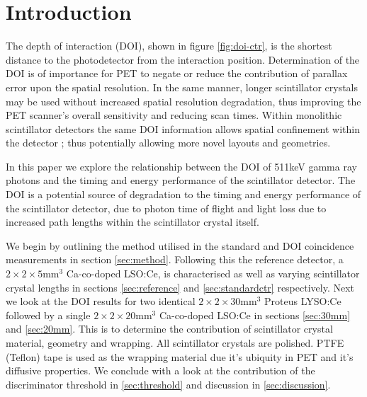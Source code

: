 \section{Introduction} 
The depth of interaction (DOI), shown in figure \ref{fig:doi-ctr}, is the shortest distance to the photodetector from the interaction position. Determination of the DOI is of importance for PET to negate or reduce the contribution of parallax error upon the spatial resolution\cite{Moses_2001}\cite{Humm_Rosenfeld_Del_Guerra_2003}. In the same manner, longer scintillator crystals may be used without increased spatial resolution degradation, thus improving the PET scanner's overall sensitivity and reducing scan times. Within monolithic scintillator detectors the same DOI information allows spatial confinement within the detector \cite{am_Borghi_Seifert_Schaart_2013}\cite{Maas_Bruyndonckx_Schaart_2012}; thus potentially allowing more novel\cite{Dendooven_Lohner_Beekman_2009}\cite{n_der_Lei_van_Dam_Schaart_2013} layouts and geometries.

In this paper we explore the relationship between the DOI of 511keV gamma ray photons and the timing and energy performance of the scintillator detector. The DOI is a potential source of degradation to the timing and energy performance of the scintillator detector, due to photon time of flight and light loss due to increased path lengths within the scintillator crystal itself.

We begin by outlining the method utilised in the standard and DOI coincidence measurements in section \ref{sec:method}. Following this the reference detector, a $2\times2\times5$mm$^3$ Ca-co-doped LSO:Ce, is characterised as well as varying scintillator crystal lengths in sections \ref{sec:reference} and \ref{sec:standardctr} respectively. Next we look at the DOI results for two identical $2\times2\times30$mm$^3$ Proteus LYSO:Ce followed by a single $2\times2\times20$mm$^3$ Ca-co-doped LSO:Ce in sections \ref{sec:30mm} and \ref{sec:20mm}. This is to determine the contribution of scintillator crystal material, geometry and wrapping. All scintillator crystals are polished. PTFE (Teflon) tape is used as the wrapping material due it's ubiquity in PET and it's diffusive properties. We conclude with a look at the contribution of the discriminator threshold in \ref{sec:threshold} and discussion in \ref{sec:discussion}.
